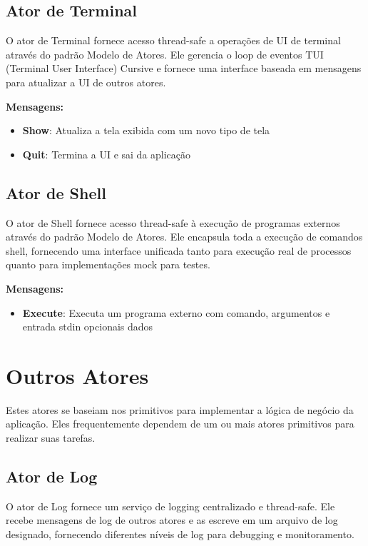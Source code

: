 \subsection{Ator de Terminal}

O ator de Terminal fornece acesso thread-safe a operações de UI de terminal através do padrão Modelo de Atores. Ele gerencia o loop de eventos TUI (Terminal User Interface) Cursive e fornece uma interface baseada em mensagens para atualizar a UI de outros atores.

\textbf{Mensagens:}

\begin{itemize}
    \item \textbf{Show}: Atualiza a tela exibida com um novo tipo de tela
    \item \textbf{Quit}: Termina a UI e sai da aplicação
\end{itemize}

\subsection{Ator de Shell}

O ator de Shell fornece acesso thread-safe à execução de programas externos através do padrão Modelo de Atores. Ele encapsula toda a execução de comandos shell, fornecendo uma interface unificada tanto para execução real de processos quanto para implementações mock para testes.

\textbf{Mensagens:}

\begin{itemize}
    \item \textbf{Execute}: Executa um programa externo com comando, argumentos e entrada stdin opcionais dados
\end{itemize}

\section{Outros Atores}

Estes atores se baseiam nos primitivos para implementar a lógica de negócio da aplicação. Eles frequentemente dependem de um ou mais atores primitivos para realizar suas tarefas.

\subsection{Ator de Log}

O ator de Log fornece um serviço de logging centralizado e thread-safe. Ele recebe mensagens de log de outros atores e as escreve em um arquivo de log designado, fornecendo diferentes níveis de log para debugging e monitoramento.

